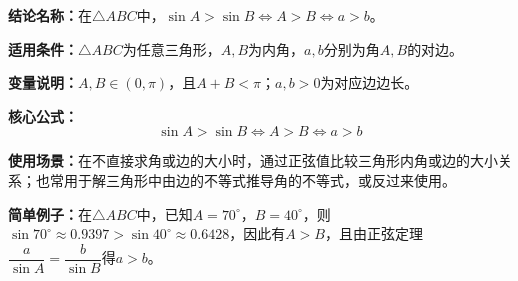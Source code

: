 \textbf{结论名称：}在$\triangle ABC$中，$\sin A > \sin B \iff A > B \iff a > b$。

\textbf{适用条件：}$\triangle ABC$为任意三角形，$A,B$为内角，$a,b$分别为角$A,B$的对边。

\textbf{变量说明：}$A,B \in (0,\pi)$，且$A+B<\pi$；$a,b>0$为对应边边长。

\textbf{核心公式：}
\[
\boxed{\sin A > \sin B \iff A > B \iff a > b}
\]

\textbf{使用场景：}在不直接求角或边的大小时，通过正弦值比较三角形内角或边的大小关系；也常用于解三角形中由边的不等式推导角的不等式，或反过来使用。

\textbf{简单例子：}在$\triangle ABC$中，已知$A=70^\circ$，$B=40^\circ$，则$\sin70^\circ \approx 0.9397 > \sin40^\circ \approx 0.6428$，因此有$A > B$，且由正弦定理$\dfrac{a}{\sin A}=\dfrac{b}{\sin B}$得$a>b$。
